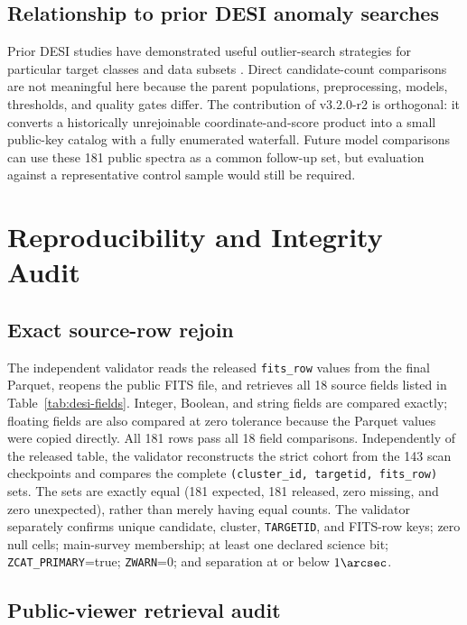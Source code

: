 \documentclass[twocolumn]{aastex701}
\newcommand{\releaseVersion}{v3.2.0-r2}
\begin{document}
\subsection{Relationship to prior DESI anomaly searches}\label{sec:prior}

Prior DESI studies have demonstrated useful outlier-search strategies for particular target
classes and data subsets \citep{Liang2023,Nicolaou2026}.  Direct candidate-count comparisons are
not meaningful here because the parent populations, preprocessing, models, thresholds, and
quality gates differ.  The contribution of \releaseVersion{} is orthogonal: it converts a historically
unrejoinable coordinate-and-score product into a small public-key catalog with a fully enumerated
waterfall.  Future model comparisons can use these 181 public spectra as a common follow-up set,
but evaluation against a representative control sample would still be required.

\section{Reproducibility and Integrity Audit}\label{sec:reproducibility}

\subsection{Exact source-row rejoin}\label{sec:exact-rejoin}

The independent validator reads the released \texttt{fits\_row} values from the final Parquet,
reopens the public FITS file, and retrieves all 18 source fields listed in
Table~\ref{tab:desi-fields}.  Integer, Boolean, and string fields are compared exactly; floating
fields are also compared at zero tolerance because the Parquet values were copied directly.
All 181 rows pass all 18 field comparisons.  Independently of the released table, the validator
reconstructs the strict cohort from the 143 scan checkpoints and compares the complete
\texttt{(cluster\_id, targetid, fits\_row)} sets.  The sets are exactly equal (181 expected,
181 released, zero missing, and zero unexpected), rather than merely having equal counts.
The validator separately confirms unique candidate,
cluster, \texttt{TARGETID}, and FITS-row keys; zero null cells; main-survey membership; at least one
declared science bit; \texttt{ZCAT\_PRIMARY}=true; \texttt{ZWARN}=0; and separation at or below
$1\arcsec$.

\subsection{Public-viewer retrieval audit}\label{sec:viewer-audit}
\end{document}
